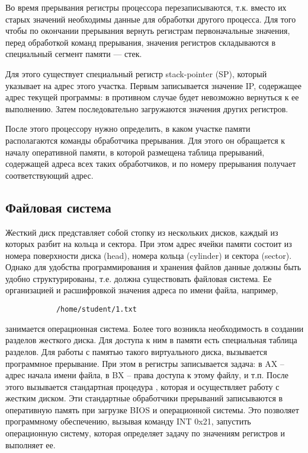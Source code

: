 \documentclass[a4paper, fleqn]{article}
\begin{document}
			Во время прерывания регистры процессора перезаписываются, т.к. вместо их старых значений необходимы данные для обработки другого процесса.   Для того чтобы по окончании прерывания вернуть регистрам первоначальные значения, перед обработкой команд прерывания, значения регистров складываются в специальный сегмент памяти --- стек.
			
			Для этого существует специальный регистр stack-pointer (SP), который указывает на адрес этого участка. 
			Первым записывается значение IP, содержащее адрес текущей программы: в противном случае будет невозможно вернуться к ее выполнению. Затем последовательно загружаются значения других регистров.
			
			После этого процессору нужно определить, в каком участке памяти располагаются команды обработчика прерывания. Для этого он обращается к началу оперативной памяти, в которой размещена таблица прерываний, содержащей адреса всех таких обработчиков, и по номеру прерывания получает соответствующий адрес.
			
		\subsection*{Файловая система}  
			Жесткий диск представляет собой стопку из нескольких дисков, каждый из которых разбит на кольца и сектора. При этом адрес ячейки памяти состоит из номера поверхности диска (head), номера кольца (cylinder) и сектора (sector).  Однако для удобства программирования и хранения файлов данные должны быть удобно структурированы, т.е. должна существовать файловая система. Ее организацией и расшифровкой значения адреса по имени файла, например,
			\begin{lstlisting}
			/home/student/1.txt
			\end{lstlisting}
			занимается операционная система. Более того возникла необходимость в создании разделов жесткого диска. 
			Для доступа к ним в памяти есть специальная таблица разделов. Для работы с памятью такого виртуального диска, вызывается программное прерывание. При этом в регистры записывается задача: в AX – адрес начала имени файла, в BX – права доступа  к этому файлу, и т.п. После этого вызывается стандартная процедура , которая и осуществляет работу с жестким диском. Эти стандартные обработчики прерываний записываются в оперативную память при загрузке BIOS и операционной системы. Это позволяет программному обеспечению, вызывая команду INT 0x21, запустить операционную систему, которая определяет задачу по значениям регистров и выполняет ее.
			
\end{document}
